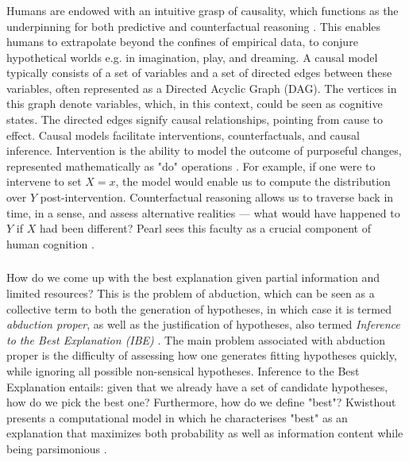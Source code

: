 \subsubsection{}
Humans are endowed with an intuitive grasp of causality, which functions as the underpinning for both predictive and counterfactual reasoning \cite{Lake_Ullman_Tenenbaum_Gershman_2017}. This enables humans to extrapolate beyond the confines of empirical data, to conjure hypothetical worlds e.g. in imagination, play, and dreaming.
A causal model typically consists of a set of variables and a set of directed edges between these variables, often represented as a Directed Acyclic Graph (DAG). The vertices in this graph denote variables, which, in this context, could be seen as cognitive states. The directed edges signify causal relationships, pointing from cause to effect.
Causal models facilitate interventions, counterfactuals, and causal inference. Intervention is the ability to model the outcome of purposeful changes, represented mathematically as "do" operations  \cite{Pearl_2018}. For example, if one were to intervene to set $X = x$, the model would enable us to compute the distribution over $Y$ post-intervention.
Counterfactual reasoning allows us to traverse back in time, in a sense, and assess alternative realities — what would have happened to $Y$ if $X$ had been different?
Pearl sees this faculty as a crucial component of human cognition \cite{Pearl_2018}.

\subsubsection{}
How do we come up with the best explanation given partial information and limited resources? This is the problem of abduction, which can be seen as a collective term to both the generation of hypotheses, in which case it is termed \textit{abduction proper}, as well as the justification of hypotheses, also termed \textit{Inference to the Best Explanation (IBE)} \cite{burks1946peirce}.
The main problem associated with abduction proper is the difficulty of assessing how one generates fitting hypotheses quickly, while ignoring all possible non-sensical hypotheses.
Inference to the Best Explanation entails: given that we already have a set of candidate hypotheses, how do we pick the best one? Furthermore, how do we define "best"? Kwisthout presents a computational model in which he characterises "best" as an explanation that maximizes both probability as well as information content while being parsimonious \cite{kwisthout2013most}.


